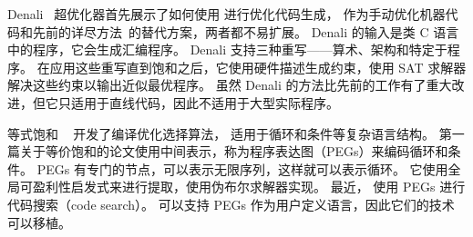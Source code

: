 Denali~\cite{denali} 超优化器首先展示了如何使用 \egraphs 进行优化代码生成，
作为手动优化机器代码和先前的详尽方法~\cite{massalin}的替代方案，两者都不易扩展。 
Denali 的输入是类 C 语言中的程序，它会生成汇编程序。 
Denali 支持三种重写——算术、架构和特定于程序。
在应用这些重写直到饱和之后，它使用硬件描述生成约束，使用 SAT 求解器解决这些约束以输出近似最优程序。
虽然 Denali 的方法比先前的工作有了重大改进，但它只适用于直线代码，因此不适用于大型实际程序。

等式饱和 ~\cite{eqsat, eqsat-llvm} 开发了编译优化选择算法，
适用于循环和条件等复杂语言结构。
第一篇关于等价饱和的论文使用中间表示，称为程序表达图（PEGs）来编码循环和条件。
PEGs 有专门的节点，可以表示无限序列，这样就可以表示循环。
它使用全局可盈利性启发式来进行提取，使用伪布尔求解器实现。
最近，\cite{yogo-pldi20} 使用 PEGs 进行代码搜索（code search）。
\egg 可以支持 PEGs 作为用户定义语言，因此它们的技术可以移植。



